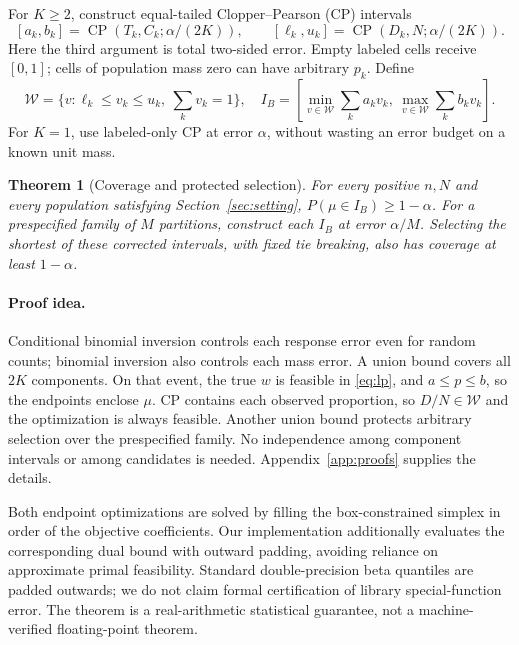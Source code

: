 \documentclass{article}
\newtheorem{theorem}{Theorem}
\newcommand{\CP}{\operatorname{CP}}
\begin{document}
For $K\geq2$, construct equal-tailed Clopper--Pearson (CP) intervals
\begin{equation}\label{eq:cpboxes}
 [a_k,b_k]=\CP(T_k,C_k;\alpha/(2K)),\qquad
 [\ell_k,u_k]=\CP(D_k,N;\alpha/(2K)).
\end{equation}
Here the third argument is total two-sided error. Empty labeled cells receive $[0,1]$; cells of population mass zero can have arbitrary $p_k$. Define
\begin{equation}\label{eq:lp}
 \mathcal W=\{v:\ell_k\leq v_k\leq u_k,\ \sum_kv_k=1\},\quad
 I_B=\left[\min_{v\in\mathcal W}\sum_ka_kv_k,\ \max_{v\in\mathcal W}\sum_kb_kv_k\right].
\end{equation}
For $K=1$, use labeled-only CP at error $\alpha$, without wasting an error budget on a known unit mass.

\begin{theorem}[Coverage and protected selection]\label{thm:exact}
For every positive $n,N$ and every population satisfying Section~\ref{sec:setting}, $P(\mu\in I_B)\geq1-\alpha$. For a prespecified family of $M$ partitions, construct each $I_B$ at error $\alpha/M$. Selecting the shortest of these corrected intervals, with fixed tie breaking, also has coverage at least $1-\alpha$.
\end{theorem}
\paragraph{Proof idea.}
Conditional binomial inversion controls each response error even for random counts; binomial inversion also controls each mass error. A union bound covers all $2K$ components. On that event, the true $w$ is feasible in \eqref{eq:lp}, and $a\leq p\leq b$, so the endpoints enclose $\mu$. CP contains each observed proportion, so $D/N\in\mathcal W$ and the optimization is always feasible. Another union bound protects arbitrary selection over the prespecified family. No independence among component intervals or among candidates is needed. Appendix~\ref{app:proofs} supplies the details.

Both endpoint optimizations are solved by filling the box-constrained simplex in order of the objective coefficients. Our implementation additionally evaluates the corresponding dual bound with outward padding, avoiding reliance on approximate primal feasibility. Standard double-precision beta quantiles are padded outwards; we do not claim formal certification of library special-function error. The theorem is a real-arithmetic statistical guarantee, not a machine-verified floating-point theorem.
\end{document}
